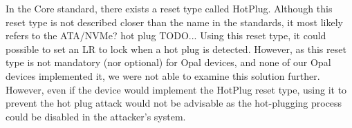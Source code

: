 In the Core standard, there exists a reset type called HotPlug. 
Although this reset type is not described closer than the name in the standards, it most likely refers to the ATA/NVMe? hot plug TODO\cite{TODO}... 
Using this reset type, it could possible to set an LR to lock when a hot plug is detected. However, as this reset type is not mandatory (nor optional) for Opal devices, and none of our Opal devices implemented it, we were not able to examine this solution further.
However, even if the device would implement the HotPlug reset type, using it to prevent the hot plug attack would not be advisable as the hot-plugging process could be disabled in the attacker's system.



